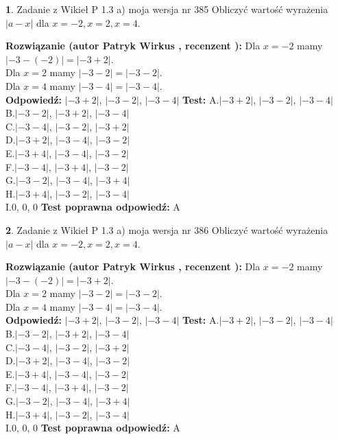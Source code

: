 \documentclass[12pt, a4paper]{article}
\theoremstyle{definition} %
\newtheorem{zad}{}
\newcommand{\zadStart}[1]{\begin{zad}#1\newline}
\newcommand{\zadStop}{\end{zad}}
\newcommand{\rozwStart}[2]{\noindent \textbf{Rozwiązanie (autor #1 , recenzent #2): }\newline}
\newcommand{\rozwStop}{\newline}
\newcommand{\odpStart}{\noindent \textbf{Odpowiedź:}\newline}
\newcommand{\odpStop}{\newline}
\newcommand{\testStart}{\noindent \textbf{Test:}\newline}
\newcommand{\testStop}{\newline}
\newcommand{\kluczStart}{\noindent \textbf{Test poprawna odpowiedź:}\newline}
\newcommand{\kluczStop}{\newline}
\begin{document}
\zadStart{Zadanie z Wikieł P 1.3 a) moja wersja nr 385}
Obliczyć wartość wyrażenia $|a - x|$ dla $x=-2,x=2,x=4$.
\zadStop
\rozwStart{Patryk Wirkus}{}
Dla $x = -2$ mamy $|-3 - (-2)| = |-3 + 2|$.\\
Dla $x = 2$ mamy $|-3 - 2| = |-3 - 2|$.\\
Dla $x = 4$ mamy $|-3 - 4| = |-3 - 4|$.\\
\rozwStop
\odpStart
$|-3 + 2|$, $|-3 - 2|$, $|-3 - 4|$
\odpStop
\testStart
A.$|-3 + 2|$, $|-3 - 2|$, $|-3 - 4|$\\
B.$|-3 - 2|$, $|-3 + 2|$, $|-3 - 4|$\\
C.$|-3 - 4|$, $|-3 - 2|$, $|-3 + 2|$\\
D.$|-3 + 2|$, $|-3 - 4|$, $|-3 - 2|$\\
E.$|-3 + 4|$, $|-3 - 4|$, $|-3 - 2|$\\
F.$|-3 - 4|$, $|-3 + 4|$, $|-3 - 2|$\\
G.$|-3 - 2|$, $|-3 - 4|$, $|-3 + 4|$\\
H.$|-3 + 4|$, $|-3 - 2|$, $|-3 - 4|$\\
I.$0$, $0$, $0$
\testStop
\kluczStart
A
\kluczStop



\zadStart{Zadanie z Wikieł P 1.3 a) moja wersja nr 386}
Obliczyć wartość wyrażenia $|a - x|$ dla $x=-2,x=2,x=4$.
\zadStop
\rozwStart{Patryk Wirkus}{}
Dla $x = -2$ mamy $|-3 - (-2)| = |-3 + 2|$.\\
Dla $x = 2$ mamy $|-3 - 2| = |-3 - 2|$.\\
Dla $x = 4$ mamy $|-3 - 4| = |-3 - 4|$.\\
\rozwStop
\odpStart
$|-3 + 2|$, $|-3 - 2|$, $|-3 - 4|$
\odpStop
\testStart
A.$|-3 + 2|$, $|-3 - 2|$, $|-3 - 4|$\\
B.$|-3 - 2|$, $|-3 + 2|$, $|-3 - 4|$\\
C.$|-3 - 4|$, $|-3 - 2|$, $|-3 + 2|$\\
D.$|-3 + 2|$, $|-3 - 4|$, $|-3 - 2|$\\
E.$|-3 + 4|$, $|-3 - 4|$, $|-3 - 2|$\\
F.$|-3 - 4|$, $|-3 + 4|$, $|-3 - 2|$\\
G.$|-3 - 2|$, $|-3 - 4|$, $|-3 + 4|$\\
H.$|-3 + 4|$, $|-3 - 2|$, $|-3 - 4|$\\
I.$0$, $0$, $0$
\testStop
\kluczStart
A
\kluczStop
\end{document}
